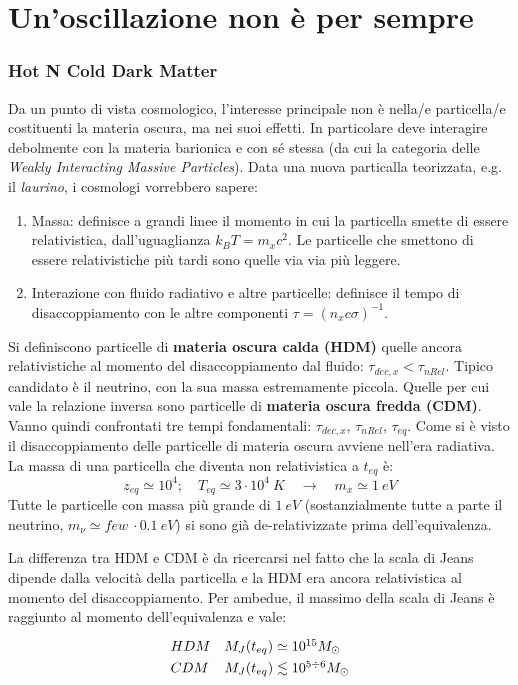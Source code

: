 \chapter{Un'oscillazione non è per sempre}\label{7:ch}

\subsection{Hot N Cold Dark Matter}
Da un punto di vista cosmologico, l'interesse principale non è nella/e particella/e costituenti la materia oscura, ma nei suoi effetti. In particolare deve interagire debolmente con la materia barionica e con sé stessa (da cui la categoria delle \textit{Weakly Interacting Massive Particles}). Data una nuova particalla teorizzata, e.g. il \textit{laurino}, i cosmologi vorrebbero sapere:
\begin{enumerate}
    \item Massa: definisce a grandi linee il momento in cui la particella smette di essere relativistica, dall'uguaglianza $k_B T = m_xc^2$. Le particelle che smettono di essere relativistiche più tardi sono quelle via via più leggere.
    \item Interazione con fluido radiativo e altre particelle: definisce il tempo di disaccoppiamento con le altre componenti $\tau = (n_x c \sigma)^{-1}$.
\end{enumerate}

Si definiscono particelle di \textbf{materia oscura calda (HDM)} quelle ancora relativistiche al momento del disaccoppiamento dal fluido: $\tau_{dec,x}<\tau_{nRel}$. Tipico candidato è il neutrino, con la sua massa estremamente piccola. Quelle per cui vale la relazione inversa sono particelle di \textbf{materia oscura fredda (CDM)}. Vanno quindi confrontati tre tempi fondamentali: $\tau_{dec,x}$, $\tau_{nRel}$, $\tau_{eq}$. 
Come si è visto il disaccoppiamento delle particelle di materia oscura avviene nell'era radiativa. La massa di una particella che diventa non relativistica a $t_{eq}$ è:
$$
z_{eq}\simeq 10^4; \quad T_{eq}\simeq 3\cdot 10^4 \: K \quad \rightarrow \quad m_x\simeq 1\: eV
$$
Tutte le particelle con massa più grande di $1\: eV$ (sostanzialmente tutte a parte il neutrino, $m_\nu\simeq few\:\cdot 0.1\: eV$) si sono già de-relativizzate prima dell'equivalenza.

\vspace{1em}

La differenza tra HDM e CDM è da ricercarsi nel fatto che la scala di Jeans dipende dalla velocità della particella e la HDM era ancora relativistica al momento del disaccoppiamento. Per ambedue, il massimo della scala di Jeans è raggiunto al momento dell'equivalenza e vale:
\begin{equation}\left.
    \def\arraystretch{1.3}
        \begin{array}{llll}
        HDM & M_J (t_{eq}) \simeq 10^{15} M_\odot\\
        CDM & M_J (t_{eq})\lesssim 10^{5\div 6} M_\odot
    \end{array}\right.
\end{equation}

